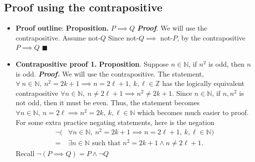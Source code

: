 \documentclass{report}
\begin{document}
    \subsection{Proof using the contrapositive}
    \begin{itemize}
        \item \textbf{Proof outline}:
            \bigbreak \noindent 
            \textbf{Proposition.} $P\implies Q$
            \bigbreak \noindent 
            \textbf{\textit{Proof}}. We will use the contrapositive. Assume not-$Q$
            Since not-$Q \implies $ not-$P$, by the contrapositive $P\implies Q $ \hspace{2.5cm} $\blacksquare $
        \item \textbf{Contrapositive proof 1.}
            \bigbreak \noindent 
            \textbf{Proposition}. Suppose $n\in \mathbb{N}$, if $n^{2}$ is odd, then $n$ is odd.
            \bigbreak \noindent 
            \textbf{\textit{Proof.}} We will use the contrapositive. The statement, $\forall \ n \in \mathbb{N},\ n^{2} = 2k+1 \implies n = 2\ell + 1,\ k,\ell \in \mathbb{Z}$ has the logically equivalent contrapositive $\forall n \in \mathbb{N},\ n \ne 2\ell + 1 \implies n^{2}\ne 2k+1$. Since $n\in \mathbb{N}$, if $n, n^{2}$  is not odd, then it must be even. Thus, the statement becomes $\forall n \in \mathbb{N},\ n = 2\ell \implies n^{2} = 2k,\ k,\ell \in \mathbb{N}$ which becomes much easier to proof. For some extra practice negating statements, here is the negation
            \begin{align*}
                \neg(&\forall n \in \mathbb{N},\ n^{2} = 2k+1 \implies n  = 2\ell  + 1,\ k,\ell \in \mathbb{N}) \\
                =\ &\exists n \in \mathbb{N} \text{ such that } n^{2}= 2k+1 \land n \ne 2\ell + 1
            .\end{align*}
            Recall $\neg(P\implies Q) = P \land \neg Q $

\end{itemize}
\end{document}
